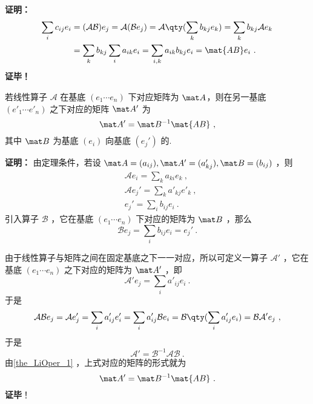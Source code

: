 \textbf{证明：}
\begin{equation}
\begin{aligned}
\sum_i c_{ij} e_i&=(\mathcal{AB}) e_j=\mathcal{A}(\mathcal{B} e_j)=\mathcal{A}\qty(\sum_k b_{kj} e_k)=\sum_k b_{kj}\mathcal{A} e_k\\
&=\sum_k b_{kj}\sum_i a_{ik} e_i=\sum_{i,k}a_{ik}b_{kj} e_i=\mat{AB} e_i~.
\end{aligned}
\end{equation}
\textbf{证毕！}

\begin{theorem}{}\label{the_LiOper_2}
若线性算子 $\mathcal A$ 在基底 $( e_1\cdots  e_n)$ 下对应矩阵为 $\mat A$，则在另一基底  $( e'_1\cdots  e'_n)$ 之下对应的矩阵 $\mat A'$ 为
\begin{equation}
\mat A'=\mat B^{-1}\mat{AB}~,
\end{equation}
其中 $\mat B$ 为基底 $( e_i)$ 向基底 $( e_j')$ 的.
\end{theorem}

\textbf{证明：}
由定理条件，若设 $\mat A=(a_{ij}), \mat A'=(a_{kj}'),\mat B=(b_{ij})$ ，则
\begin{equation}
\begin{aligned}
&\mathcal{A} e_i=\sum_{k} a_{ki} e_k
~,\\
&\mathcal{A} e_j'=\sum_{k} a'_{kj} e'_k~,\\
& e_j'=\sum_i b_{ij} e_i~.
\end{aligned}
\end{equation}
引入算子 $\mathcal{B}$ ，它在基底 $( e_1\cdots  e_n)$ 下对应的矩阵为 $\mat B$ ，那么
\begin{equation}
\mathcal{B} e_j=\sum_i b_{ij} e_i= e_j'~.
\end{equation}

由于线性算子与矩阵之间在固定基底之下一一对应，所以可定义一算子 $\mathcal{A'}$ ，它在基底 $( e_1\cdots  e_n)$ 之下对应的矩阵为 $\mat A'$ ，即
\begin{equation}
\mathcal A' e_j=\sum_i a'_{ij} e_i~.
\end{equation}
于是
\begin{equation}
\mathcal{AB} e_j=\mathcal{A} e'_j=\sum_i a'_{ij}  e'_i=\sum_i a'_{ij}\mathcal{B} e_i=\mathcal{B}\qty(\sum_i a'_{ij} e_i)=\mathcal{BA'} e_j~,
\end{equation}
于是 
\begin{equation}
\mathcal{A'}=\mathcal{B}^{-1}\mathcal{AB}~.
\end{equation}
由\autoref{the_LiOper_1} ，上式对应的矩阵的形式就为
\begin{equation}
\mat A'=\mat B^{-1}\mat{AB}~.
\end{equation}
\textbf{证毕}！


